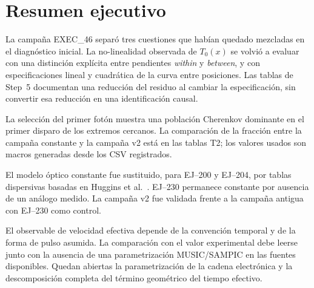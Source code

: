 \chapter{Resumen ejecutivo}
La campaña EXEC\_46 separó tres cuestiones que habían quedado mezcladas en el diagnóstico inicial. La no-linealidad observada de $T_0(x)$ se volvió a evaluar con una distinción explícita entre pendientes \emph{within} y \emph{between}, y con especificaciones lineal y cuadrática de la curva entre posiciones. Las tablas de Step~5 documentan una reducción del residuo al cambiar la especificación, sin convertir esa reducción en una identificación causal.

La selección del primer fotón muestra una población Cherenkov dominante en el primer disparo de los extremos cercanos. La comparación de la fracción entre la campaña constante y la campaña v2 está en las tablas T2; los valores usados son macros generadas desde los CSV registrados.

El modelo óptico constante fue sustituido, para EJ--200 y EJ--204, por tablas dispersivas basadas en Huggins et al.~\cite{Huggins2026}. EJ--230 permanece constante por ausencia de un análogo medido. La campaña v2 fue validada frente a la campaña antigua con EJ--230 como control.

El observable de velocidad efectiva depende de la convención temporal y de la forma de pulso asumida. La comparación con el valor experimental debe leerse junto con la ausencia de una parametrización MUSIC/SAMPIC en las fuentes disponibles. Quedan abiertas la parametrización de la cadena electrónica y la descomposición completa del término geométrico del tiempo efectivo.
